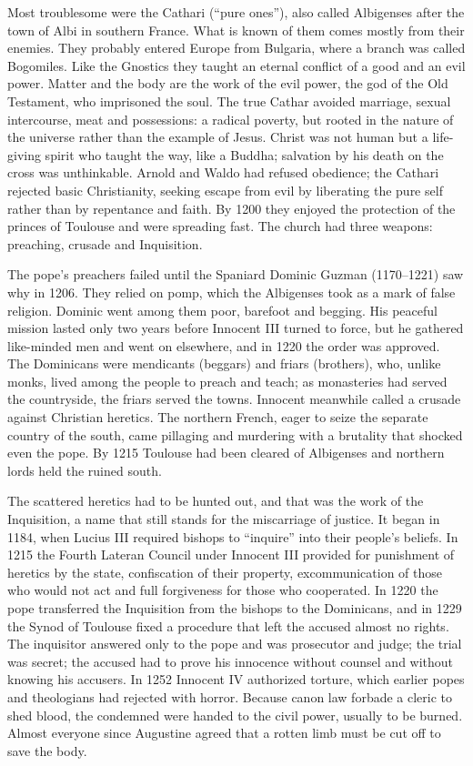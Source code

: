 Most troublesome were the Cathari (``pure ones''), also called Albigenses after the town of Albi in
southern France. What is known of them comes mostly from their enemies. They probably entered Europe
from Bulgaria, where a branch was called Bogomiles. Like the Gnostics they taught an eternal conflict
of a good and an evil power. Matter and the body are the work of the evil power, the god of the Old
Testament, who imprisoned the soul. The true Cathar avoided marriage, sexual intercourse, meat and
possessions: a radical poverty, but rooted in the nature of the universe rather than the example of
Jesus. Christ was not human but a life-giving spirit who taught the way, like a Buddha; salvation by
his death on the cross was unthinkable. Arnold and Waldo had refused obedience; the Cathari rejected
basic Christianity, seeking escape from evil by liberating the pure self rather than by repentance
and faith. By 1200 they enjoyed the protection of the princes of Toulouse and were spreading fast.
The church had three weapons: preaching, crusade and Inquisition.

The pope's preachers failed until the Spaniard Dominic Guzman (1170--1221) saw why in 1206. They
relied on pomp, which the Albigenses took as a mark of false religion. Dominic went among them poor,
barefoot and begging. His peaceful mission lasted only two years before Innocent III turned to
force, but he gathered like-minded men and went on elsewhere, and in 1220 the order was approved. The
Dominicans were mendicants (beggars) and friars (brothers), who, unlike monks, lived among the people
to preach and teach; as monasteries had served the countryside, the friars served the towns. Innocent
meanwhile called a crusade against Christian heretics. The northern French, eager to seize the
separate country of the south, came pillaging and murdering with a brutality that shocked even the
pope. By 1215 Toulouse had been cleared of Albigenses and northern lords held the ruined south.

The scattered heretics had to be hunted out, and that was the work of the Inquisition, a name that
still stands for the miscarriage of justice. It began in 1184, when Lucius III required bishops to
``inquire'' into their people's beliefs. In 1215 the Fourth Lateran Council under Innocent III
provided for punishment of heretics by the state, confiscation of their property, excommunication of
those who would not act and full forgiveness for those who cooperated. In 1220 the pope transferred
the Inquisition from the bishops to the Dominicans, and in 1229 the Synod of Toulouse fixed a
procedure that left the accused almost no rights. The inquisitor answered only to the pope and was
prosecutor and judge; the trial was secret; the accused had to prove his innocence without counsel
and without knowing his accusers. In 1252 Innocent IV authorized torture, which earlier popes and
theologians had rejected with horror. Because canon law forbade a cleric to shed blood, the condemned
were handed to the civil power, usually to be burned. Almost everyone since Augustine agreed that a
rotten limb must be cut off to save the body.

